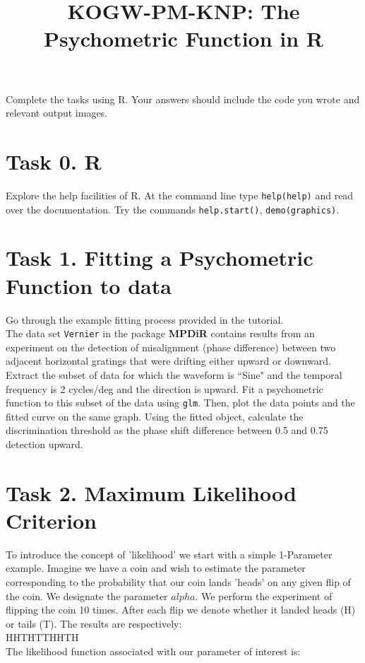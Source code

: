 \documentclass[12pt,english]{scrartcl}
\title{KOGW-PM-KNP: The Psychometric Function in R}
\begin{document}
\maketitle


Complete the tasks using R. Your answers should include the code you wrote and relevant output images.

\section*{Task 0. R}
Explore the help facilities of R. At the command line type \texttt{help(help)} and read over the documentation. Try the commands \texttt{help.start()}, \texttt{demo(graphics)}.

\section*{Task 1. Fitting a Psychometric Function to data}
Go through the example fitting process provided in the tutorial. \\
The data set \texttt{Vernier} in the package \textbf{MPDiR} contains results from an experiment on the detection of misalignment (phase difference) between two adjacent horizontal gratings that were drifting either upward or downward. Extract the subset of data for which the waveform is ``Sine" and the temporal frequency is 2 cycles/deg and the direction is upward. Fit a psychometric function to this subset of the data using \texttt{glm}. Then, plot the data points and the fitted curve on the same graph. Using the fitted object, calculate the discrimination threshold as the phase shift difference between 0.5 and 0.75 detection upward. 




\section*{Task 2. Maximum Likelihood Criterion}
To introduce the concept of 'likelihood' we start with a simple 1-Parameter example. 
Imagine we have a coin and wish to estimate the parameter corresponding to the probability that our coin lands 'heads' on any given flip of the coin. We designate the parameter $alpha$. We perform the experiment of flipping the coin 10 times. After each flip we denote whether it landed heads (H) or tails (T). The results are respectively: \\
HHTHTTHHTH\\

The likelihood function associated with our parameter of interest is:\\
\end{document}
